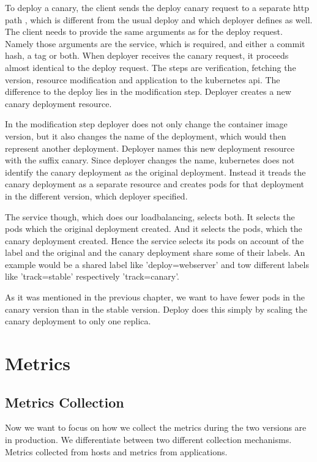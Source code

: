 To deploy a canary, the client sends the deploy canary request to a separate http path ,
which is different from the usual deploy and which deployer defines as well. The client
needs to provide the same arguments as for the deploy request. Namely those arguments are
the service, which is required, and either a commit hash, a tag or both. When deployer
receives the canary request, it proceeds almost identical to the deploy request. The steps
are verification, fetching the version, resource modification and application to the
kubernetes api. The difference to the deploy lies in the modification step. Deployer
creates a new canary deployment resource.

In the modification step deployer does not only change the container image version, but it
also changes the name of the deployment, which would then represent another
deployment. Deployer names this new deployment resource with the suffix canary. Since
deployer changes the name, kubernetes does not identify the canary deployment as the
original deployment. Instead it treads the canary deployment as a separate resource and
creates pods for that deployment in the different version, which deployer specified.

The service though, which does our loadbalancing, selects both. It selects the pods which
the original deployment created. And it selects the pods, which the canary deployment
created. Hence the service selects its pods on account of the label and the original and
the canary deployment share some of their labels. An example would be a shared label like
'deploy=webserver' and tow different labels like 'track=stable' respectively
'track=canary'.

As it was mentioned in the previous chapter, we want to have fewer pods in the canary
version than in the stable version. Deploy does this simply by scaling the canary
deployment to only one replica.

\section{Metrics}

\subsection{Metrics Collection}

Now we want to focus on how we collect the metrics during the two versions are in
production. We differentiate between two different collection mechanisms. Metrics
collected from hosts and metrics from applications.

